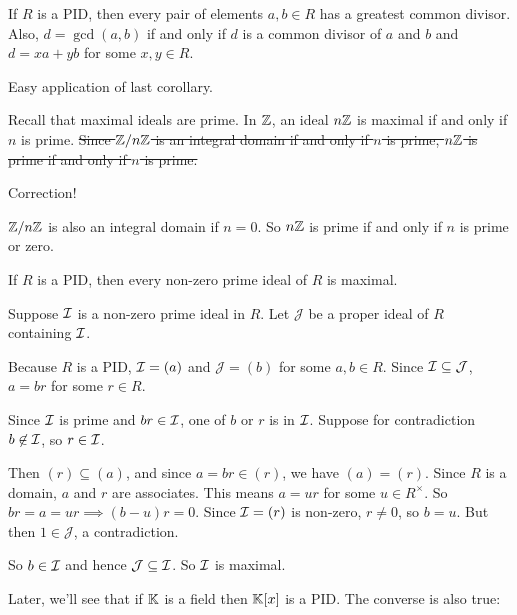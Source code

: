 \documentclass[12pt,letterpaper]{report}
\begin{document}
\begin{prop}{}{}
  If $R$ is a PID, then every pair of elements $a, b \in R$ has a greatest common divisor.
  Also, $d = \gcd(a, b)$ if and only if $d$ is a common divisor of $a$ and $b$ and $d = xa + yb$
  for some $x, y \in R$.
\end{prop}

\begin{thmproof}
  Easy application of last corollary.
\end{thmproof}

Recall that maximal ideals are prime.
In $\mathbb{Z}$, an ideal $n\mathbb{Z}$ is maximal if and only if $n$ is prime.
\sout{Since $\mathbb{Z}/{n}\mathbb{Z}$ is an integral domain if and only if $n$ is prime, $n\mathbb{Z}$ is prime if and only
if $n$ is prime.}

\begin{tcolorbox}
  Correction!

  $\mathbb{Z}/{n}\mathbb{Z}$ is also an integral domain if $n = 0$.
  So $n\mathbb{Z}$ is prime if and only if $n$ is prime or zero.
\end{tcolorbox}

\begin{prop}{}{}
  If $R$ is a PID, then every non-zero prime ideal of $R$ is maximal.
\end{prop}

\begin{thmproof}
  Suppose $\mathcal{I}$ is a non-zero prime ideal in $R$.
  Let $\mathcal{J}$ be a proper ideal of $R$ containing $\mathcal{I}$.

  Because $R$ is a PID, $\mathcal{I} = (a)$ and $\mathcal{J} = (b)$ for some $a, b \in R$.
  Since $\mathcal{I} \subseteq \mathcal{J}$, $a = br$ for some $r \in R$.

  Since $\mathcal{I}$ is prime and $br \in \mathcal{I}$, one of $b$ or $r$ is in $\mathcal{I}$.
  Suppose for contradiction $b \not\in \mathcal{I}$, so $r \in \mathcal{I}$.

  Then $(r) \subseteq (a)$, and since $a = br \in (r)$, we have $(a) = (r)$.
  Since $R$ is a domain, $a$ and $r$ are associates.
  This means $a = ur$ for some $u \in R^\times$.
  So $br = a = ur \implies (b - u)r = 0$.
  Since $\mathcal{I} = (r)$ is non-zero, $r \neq 0$, so $b = u$.
  But then $1 \in \mathcal{J}$, a contradiction.

  So $b \in \mathcal{I}$ and hence $\mathcal{J} \subseteq \mathcal{I}$.
  So $\mathcal{I}$ is maximal.
\end{thmproof}

Later, we'll see that if $\mathbb{K}$ is a field then $\mathbb{K}[x]$ is a PID.
The converse is also true:
\end{document}
